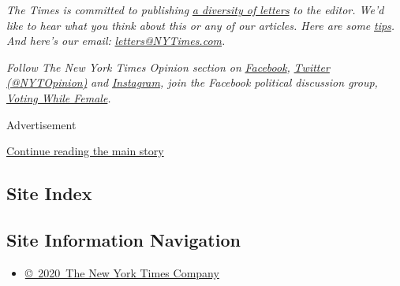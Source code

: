 \emph{The Times is committed to publishing}
\href{https://www.nytimes3xbfgragh.onion/2019/01/31/opinion/letters/letters-to-editor-new-york-times-women.html}{\emph{a
diversity of letters}} \emph{to the editor. We'd like to hear what you
think about this or any of our articles. Here are some}
\href{https://help.nytimes3xbfgragh.onion/hc/en-us/articles/115014925288-How-to-submit-a-letter-to-the-editor}{\emph{tips}}\emph{.
And here's our email:}
\href{mailto:letters@NYTimes.com}{\emph{letters@NYTimes.com}}\emph{.}

\emph{Follow The New York Times Opinion section on}
\href{https://www.facebookcorewwwi.onion/nytopinion}{\emph{Facebook}}\emph{,}
\href{http://twitter.com/NYTOpinion}{\emph{Twitter (@NYTOpinion)}}
\emph{and}
\href{https://www.instagram.com/nytopinion/}{\emph{Instagram}}\emph{,
join the Facebook political discussion group,}
\href{https://www.facebookcorewwwi.onion/groups/votingwhilefemale/}{\emph{Voting
While Female}}\emph{.}

Advertisement

\protect\hyperlink{after-bottom}{Continue reading the main story}

\hypertarget{site-index}{%
\subsection{Site Index}\label{site-index}}

\hypertarget{site-information-navigation}{%
\subsection{Site Information
Navigation}\label{site-information-navigation}}

\begin{itemize}
\tightlist
\item
  \href{https://help.nytimes3xbfgragh.onion/hc/en-us/articles/115014792127-Copyright-notice}{©~2020~The
  New York Times Company}
\end{itemize}

